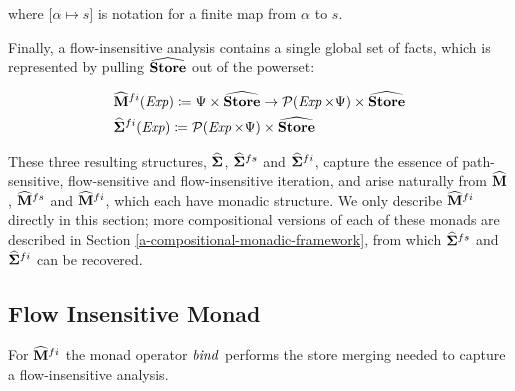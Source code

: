 where $ \lbrack  \alpha   \mapsto  s \rbrack $ is notation for a finite
map from $ \alpha $ to $s$.

\par

Finally, a flow-insensitive analysis contains a single global set of
facts, which is represented by pulling $ \widehat{\mathtt{\mathbf{Store}}} $ out of
the powerset:

\small\begin{align*}
&\hspace{0em}  \widehat{\mathtt{\mathbf{M}}} ^{  fi }  (\operatorname{\mathit{Exp}})   \coloneqq   \Psi   \times   \widehat{\mathtt{\mathbf{Store}}}   \rightarrow   \mathcal{P}  (\operatorname{\mathit{Exp}}   \times   \Psi )  \times   \widehat{\mathtt{\mathbf{Store}}}  \\
&\hspace{0em}  \widehat{\mathtt{\mathbf{\Sigma}}}  ^{ fi }  (\operatorname{\mathit{Exp}})   \coloneqq   \mathcal{P}  (\operatorname{\mathit{Exp}}   \times   \Psi )  \times   \widehat{\mathtt{\mathbf{Store}}} 
\end{align*}\normalsize

\par

These three resulting structures, $ \widehat{\mathtt{\mathbf{\Sigma}}} $,
$ \widehat{\mathtt{\mathbf{\Sigma}}}  ^{ fs } $ and $ \widehat{\mathtt{\mathbf{\Sigma}}}  ^{ fi } $,
capture the essence of path-sensitive, flow-sensitive and
flow-insensitive iteration, and arise naturally from
$ \widehat{\mathtt{\mathbf{M}}} $, $ \widehat{\mathtt{\mathbf{M}}} ^{  fs } $ and
$ \widehat{\mathtt{\mathbf{M}}} ^{  fi } $, which each have monadic structure. We
only describe $ \widehat{\mathtt{\mathbf{M}}} ^{  fi } $ directly in this section;
more compositional versions of each of these monads are described in
Section \ref{a-compositional-monadic-framework}, from which
$ \widehat{\mathtt{\mathbf{\Sigma}}}  ^{ fs } $ and $ \widehat{\mathtt{\mathbf{\Sigma}}}  ^{ fi } $ can be
recovered.

\par

\subsection{Flow Insensitive Monad}\label{flow-insensitive-monad}

\par

For $ \widehat{\mathtt{\mathbf{M}}} ^{  fi } $ the monad operator $ \operatorname{\mathit{bind}} $
performs the store merging needed to capture a flow-insensitive
analysis.

